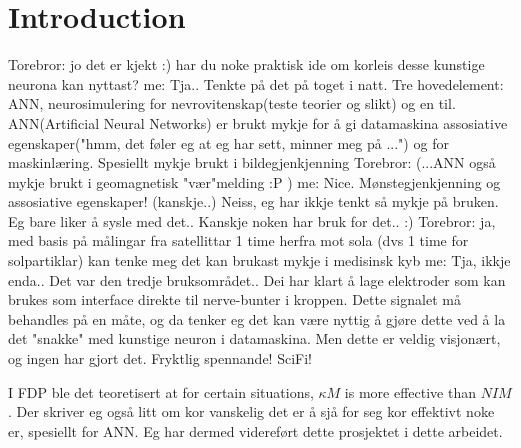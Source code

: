 

\section{Introduction}


Torebror: jo det er kjekt :)
	har du noke praktisk ide om korleis desse kunstige neurona kan nyttast?
me: Tja.. Tenkte på det på toget i natt. Tre hovedelement: ANN, neurosimulering for nevrovitenskap(teste teorier og slikt)
	og en til.
	ANN(Artificial Neural Networks) er brukt mykje for å gi datamaskina assosiative egenskaper("hmm, det føler eg at eg har sett, minner meg på ...") og for maskinlæring. Spesiellt mykje brukt i bildegjenkjenning
Torebror: (...ANN også mykje brukt i geomagnetisk "vær"melding :P )
me: Nice. Mønstegjenkjenning og assosiative egenskaper!
	(kanskje..)
	Neiss, eg har ikkje tenkt så mykje på bruken. Eg bare liker å sysle med det..
	Kanskje noken har bruk for det..
	:)
Torebror: ja, med basis på målingar fra satellittar 1 time herfra mot sola (dvs 1 time for solpartiklar)
	kan tenke meg det kan brukast mykje i medisinsk kyb
me: Tja, ikkje enda..
	Det var den tredje bruksområdet..
	Dei har klart å lage elektroder som kan brukes som interface direkte til nerve-bunter i kroppen.
	Dette signalet må behandles på en måte, og da tenker eg det kan være nyttig å gjøre dette ved å la det "snakke" med kunstige neuron i datamaskina. Men dette er veldig visjonært, og ingen har gjort det.
	Fryktlig spennande! SciFi!



I FDP ble det teoretisert at 
	for certain situations, $\kappa M$ is more effective than $NIM$.
Der skriver eg også litt om kor  vanskelig det er å sjå for seg kor effektivt noke er, spesiellt for ANN.
Eg har dermed videreført dette prosjektet i dette arbeidet.




